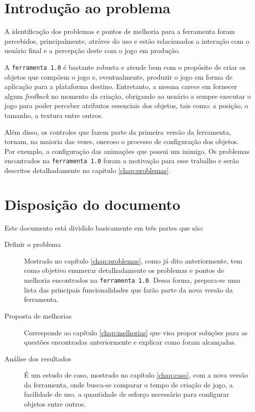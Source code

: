 \documentclass[12pt,twoside,openright,a4paper,english,brazil,sumario=tradicional]{abntex2}
\begin{document}
\section{Introdução ao problema}
A identificação dos problemas e pontos de melhoria para a ferramenta foram percebidos, principalmente, atráves do uso e estão relacionados a interação com o usuário final e a percepção deste com o jogo em produção.

A \texttt{ferramenta 1.0} é bastante robusta e atende bem com o propósito de criar os objetos que compõem o jogo e, eventualmente, produzir o jogo em forma de aplicação para a plataforma destino. Entretanto, a mesma carece em fornecer algum \emph{feedback} no momento da criação, obrigando ao usuário a sempre executar o jogo para poder perceber atributos essenciais dos objetos, tais como: a posição, o tamanho, a textura entre outros.

Além disso, os controles que fazem parte da primeira versão da ferramenta, tornam, na maioria das vezes, oneroso o processo de configuração dos objetos. Por exemplo, a configuração das animações que possui um inimigo. Os problemas encontrados na \texttt{ferramenta 1.0} foram a motivação para esse trabalho e serão descritos detalhadamente no capitulo \ref{chap:problemas}.

\section{Disposição do documento}
Este documento está dividido basicamente em três partes que são:
\begin{description}
	\item[Definir o problema] Mostrado no capítulo \ref{chap:problemas}, como já dito anteriormente, tem como objetivo enumerar detalhadamente os problemas e pontos de melhoria encontrados na \texttt{ferramenta 1.0}. Dessa forma, prepara-se uma lista das principais funcionalidades que farão parte da nova versão da ferramenta.
	\item[Proposta de melhorias] Corresponde ao capítulo \ref{chap:melhorias} que visa propor soluções para as questões encontradas anteriormente e explicar como foram alcançadas.
	\item[Análise dos resultados] É um estudo de caso, mostrado no capítulo \ref{chap:caso}, com a nova versão da ferramenta, onde busca-se comparar o tempo de criação de jogo, a facilidade de uso, a quantidade de esforço necessário para configurar objetos entre outros.
\end{description}
\end{document}

